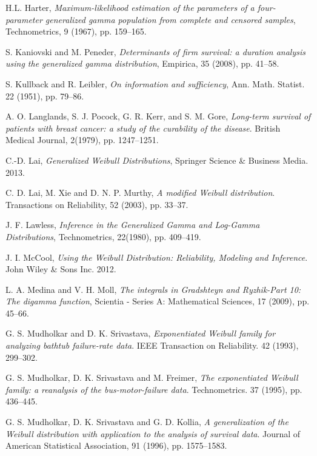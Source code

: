 \documentclass{ps}
\theoremstyle{plain}%
\theoremstyle{definition}
\theoremstyle{remark}
\begin{document}
\begin{thebibliography}{}
	H.L. Harter,   \emph{Maximum-likelihood estimation of the parameters of a four-parameter generalized gamma population from complete and censored samples},  Technometrics, 9 (1967),  pp. 159--165.
	
	S. Kaniovski and  M. Peneder,   \emph{Determinants of firm survival: a duration analysis using the generalized gamma distribution},  Empirica,  35 (2008),   pp. 41--58.
	
	S. Kullback and R. Leibler,  \emph{On information and sufficiency},  Ann. Math. Statist. 22 (1951),  pp. 79--86.
	
	A. O. Langlands,  S. J. Pocock,  G. R. Kerr,  and  S. M. Gore,  \emph{Long-term survival of patients with breast cancer: a study of the curability of the disease}. British Medical Journal, 2(1979),  pp. 1247--1251.
	
	C.-D. Lai,  \emph{Generalized Weibull Distributions}, Springer Science \& Business Media. 2013.
	
	C. D. Lai,  M.  Xie and D. N. P. Murthy,  \emph{A modified Weibull distribution}. Transactions on Reliability, 52 (2003),  pp. 33--37.
	
	J. F. Lawless,   \emph{Inference in the Generalized Gamma and Log-Gamma Distributions}, Technometrics, 22(1980),  pp. 409--419. 
	
	J. I. McCool,  \emph{Using the Weibull Distribution: Reliability, Modeling and Inference}. John Wiley \& Sons Inc. 2012.
	
	L. A. Medina and V. H. Moll,  \emph{The integrals in Gradshteyn and Ryzhik-Part 10: The digamma function}, Scientia - Series A: Mathematical Sciences,  17 (2009),  pp. 45--66.
	
	G. S. Mudholkar and D. K. Srivastava,  \emph{Exponentiated Weibull family for analyzing bathtub failure-rate data}. IEEE Transaction on Reliability. 42 (1993), 299--302.
	
	G. S. Mudholkar,   D. K. Srivastava and  M. Freimer,  \emph{The exponentiated Weibull family: a reanalysis of the bus-motor-failure data}. Technometrics. 37 (1995),  pp. 436--445.
	
	G. S. Mudholkar,   D. K. Srivastava and G. D. Kollia,   \emph{A generalization of the Weibull distribution with application to the analysis of survival data}. Journal of American Statistical Association, 91 (1996),  pp. 1575--1583.
	

\end{thebibliography}
\end{document}
